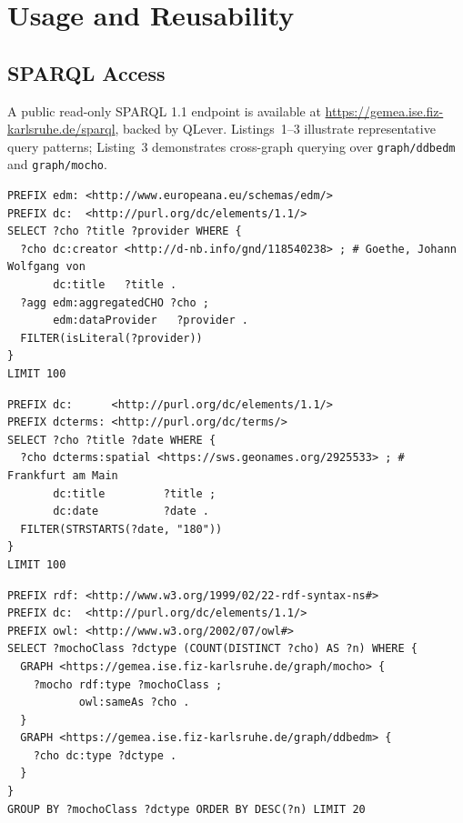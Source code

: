 
\section{Usage and Reusability}
\label{sec:usage}

\subsection{SPARQL Access}

A public read-only SPARQL 1.1 endpoint is available at \url{https://gemea.ise.fiz-karlsruhe.de/sparql}, backed by QLever.
Listings~1--3 illustrate representative query patterns; Listing~3 demonstrates cross-graph querying over \texttt{graph/ddbedm} and \texttt{graph/mocho}.

\begin{lstlisting}[language=SPARQL, basicstyle=\ttfamily\small, breaklines=true, caption={Objects associated with a given agent (GND URI).}]
PREFIX edm: <http://www.europeana.eu/schemas/edm/>
PREFIX dc:  <http://purl.org/dc/elements/1.1/>
SELECT ?cho ?title ?provider WHERE {
  ?cho dc:creator <http://d-nb.info/gnd/118540238> ; # Goethe, Johann Wolfgang von
       dc:title   ?title .
  ?agg edm:aggregatedCHO ?cho ;
       edm:dataProvider   ?provider .
  FILTER(isLiteral(?provider))
}
LIMIT 100
\end{lstlisting}

\begin{lstlisting}[language=SPARQL, basicstyle=\ttfamily\small, breaklines=true, caption={Objects associated with a given place.}]
PREFIX dc:      <http://purl.org/dc/elements/1.1/>
PREFIX dcterms: <http://purl.org/dc/terms/>
SELECT ?cho ?title ?date WHERE {
  ?cho dcterms:spatial <https://sws.geonames.org/2925533> ; # Frankfurt am Main
       dc:title         ?title ;
       dc:date          ?date .
  FILTER(STRSTARTS(?date, "180"))
}
LIMIT 100
\end{lstlisting}

\begin{lstlisting}[language=SPARQL, basicstyle=\ttfamily\small, breaklines=true, caption={Source type strings alongside aligned mocho classes.}]
PREFIX rdf: <http://www.w3.org/1999/02/22-rdf-syntax-ns#>
PREFIX dc:  <http://purl.org/dc/elements/1.1/>
PREFIX owl: <http://www.w3.org/2002/07/owl#>
SELECT ?mochoClass ?dctype (COUNT(DISTINCT ?cho) AS ?n) WHERE {
  GRAPH <https://gemea.ise.fiz-karlsruhe.de/graph/mocho> {
    ?mocho rdf:type ?mochoClass ;
           owl:sameAs ?cho .
  }
  GRAPH <https://gemea.ise.fiz-karlsruhe.de/graph/ddbedm> {
    ?cho dc:type ?dctype .
  }
}
GROUP BY ?mochoClass ?dctype ORDER BY DESC(?n) LIMIT 20
\end{lstlisting}


